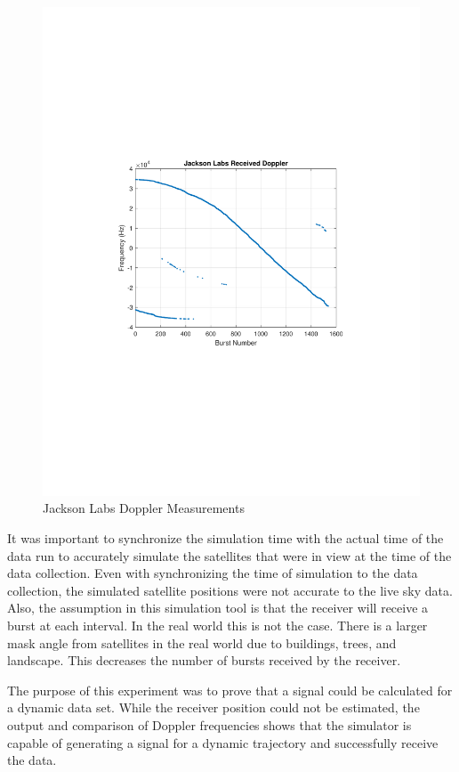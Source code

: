 \documentclass[12pt]{report}
\begin{document}
\begin{figure}[h!]
    \centering
    \includegraphics[trim=1.2in 3.3in 1.75in 3.3in,clip,width=5in]
    {Dynamic_JL_Doppler-2.pdf}
    \caption{Jackson Labs Doppler Measurements}
    \label{fig:JLdynamdop}
\end{figure}

It was important to synchronize the simulation time with the actual time of the data run to accurately simulate the satellites that were in view at the time of the data collection. Even with synchronizing the time of simulation to the data collection, the simulated satellite positions were not accurate to the live sky data. Also, the assumption in this simulation tool is that the receiver will receive a burst at each interval. In the real world this is not the case. There is a larger mask angle from satellites in the real world due to buildings, trees, and landscape. This decreases the number of bursts received by the receiver. 

The purpose of this experiment was to prove that a signal could be calculated for a dynamic data set. While the receiver position could not be estimated, the output and comparison of Doppler frequencies shows that the simulator is capable of generating a signal for a dynamic trajectory and successfully receive the data.  
\end{document}
